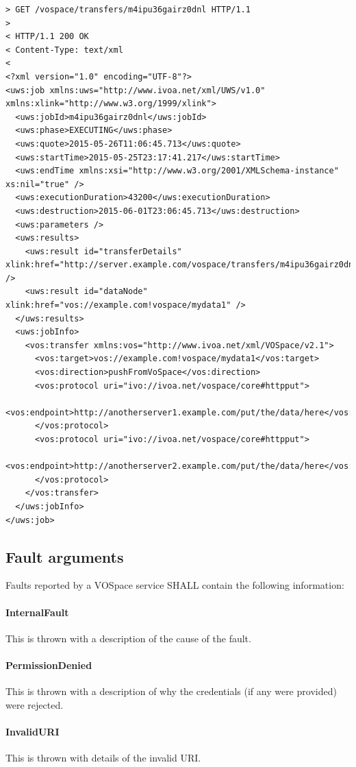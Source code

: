 \documentclass[11pt,a4paper]{ivoa}
\begin{document}
\begin{lstlisting}
> GET /vospace/transfers/m4ipu36gairz0dnl HTTP/1.1
>
< HTTP/1.1 200 OK
< Content-Type: text/xml
<
<?xml version="1.0" encoding="UTF-8"?>
<uws:job xmlns:uws="http://www.ivoa.net/xml/UWS/v1.0" xmlns:xlink="http://www.w3.org/1999/xlink">
  <uws:jobId>m4ipu36gairz0dnl</uws:jobId>
  <uws:phase>EXECUTING</uws:phase>
  <uws:quote>2015-05-26T11:06:45.713</uws:quote>
  <uws:startTime>2015-05-25T23:17:41.217</uws:startTime>
  <uws:endTime xmlns:xsi="http://www.w3.org/2001/XMLSchema-instance" xs:nil="true" />
  <uws:executionDuration>43200</uws:executionDuration>
  <uws:destruction>2015-06-01T23:06:45.713</uws:destruction>
  <uws:parameters />
  <uws:results>
    <uws:result id="transferDetails" xlink:href="http://server.example.com/vospace/transfers/m4ipu36gairz0dnl/results/transferDetails" />
    <uws:result id="dataNode" xlink:href="vos://example.com!vospace/mydata1" />
  </uws:results>
  <uws:jobInfo>
    <vos:transfer xmlns:vos="http://www.ivoa.net/xml/VOSpace/v2.1">
      <vos:target>vos://example.com!vospace/mydata1</vos:target>
      <vos:direction>pushFromVoSpace</vos:direction>
      <vos:protocol uri="ivo://ivoa.net/vospace/core#httpput">
        <vos:endpoint>http://anotherserver1.example.com/put/the/data/here</vos:endpoint>
      </vos:protocol>
      <vos:protocol uri="ivo://ivoa.net/vospace/core#httpput">
        <vos:endpoint>http://anotherserver2.example.com/put/the/data/here</vos:endpoint>
      </vos:protocol>
    </vos:transfer>
  </uws:jobInfo>
</uws:job>
\end{lstlisting}

\subsection{Fault arguments}
\label{subsec:fault arguments}
Faults reported by a VOSpace service SHALL contain the following information:

\paragraph{InternalFault}
This is thrown with a description of the cause of the fault.

\paragraph{PermissionDenied}
This is thrown with a description of why the credentials (if any were provided) were rejected.

\paragraph{InvalidURI}
This is thrown with details of the invalid URI.
\end{document}
